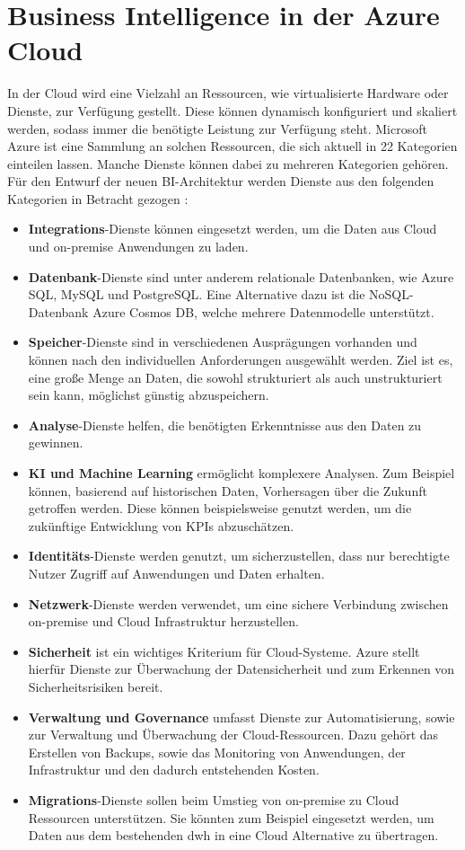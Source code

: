 \section{Business Intelligence in der Azure Cloud} \label{sec:grundlagen:bi_in_der_cloud_mit_azure}
In der Cloud wird eine Vielzahl an Ressourcen, wie virtualisierte Hardware oder Dienste, zur Verfügung gestellt. Diese können dynamisch konfiguriert und skaliert werden, sodass immer die benötigte Leistung zur Verfügung steht. Microsoft Azure ist eine Sammlung an solchen Ressourcen, die sich aktuell in 22 Kategorien einteilen lassen. Manche Dienste können dabei zu mehreren Kategorien gehören. Für den Entwurf der neuen BI-Architektur werden Dienste aus den folgenden Kategorien in Betracht gezogen \cite{chilberto_building_2020}:
\begin{itemize}
\item \textbf{Integrations}-Dienste können eingesetzt werden, um die Daten aus Cloud und on-premise Anwendungen zu laden.
\item \textbf{Datenbank}-Dienste sind unter anderem relationale Datenbanken, wie Azure SQL, MySQL und PostgreSQL. Eine Alternative dazu ist die NoSQL-Datenbank Azure Cosmos DB, welche mehrere Datenmodelle unterstützt.
\item \textbf{Speicher}-Dienste sind in verschiedenen Ausprägungen vorhanden und können nach den individuellen Anforderungen ausgewählt werden. Ziel ist es, eine große Menge an Daten, die sowohl strukturiert als auch unstrukturiert sein kann, möglichst günstig abzuspeichern.
\item \textbf{Analyse}-Dienste helfen, die benötigten Erkenntnisse aus den Daten zu gewinnen.
\item \textbf{KI und Machine Learning} ermöglicht komplexere Analysen. Zum Beispiel können, basierend auf historischen Daten, Vorhersagen über die Zukunft getroffen werden. Diese können beispielsweise genutzt werden, um die zukünftige Entwicklung von KPIs abzuschätzen.
\item \textbf{Identitäts}-Dienste werden genutzt, um sicherzustellen, dass nur berechtigte Nutzer Zugriff auf Anwendungen und Daten erhalten.
\item \textbf{Netzwerk}-Dienste werden verwendet, um eine sichere Verbindung zwischen on-premise und Cloud Infrastruktur herzustellen.
\item \textbf{Sicherheit} ist ein wichtiges Kriterium für Cloud-Systeme. Azure stellt hierfür Dienste zur Überwachung der Datensicherheit und zum Erkennen von Sicherheitsrisiken bereit.
\item \textbf{Verwaltung und Governance} umfasst Dienste zur Automatisierung, sowie zur Verwaltung und Überwachung der Cloud-Ressourcen. Dazu gehört das Erstellen von Backups, sowie das Monitoring von Anwendungen, der Infrastruktur und den dadurch entstehenden Kosten.
\item \textbf{Migrations}-Dienste sollen beim Umstieg von on-premise zu Cloud Ressourcen unterstützen. Sie könnten zum Beispiel eingesetzt werden, um Daten aus dem bestehenden \ac{dwh} in eine Cloud Alternative zu übertragen.
\end{itemize}
